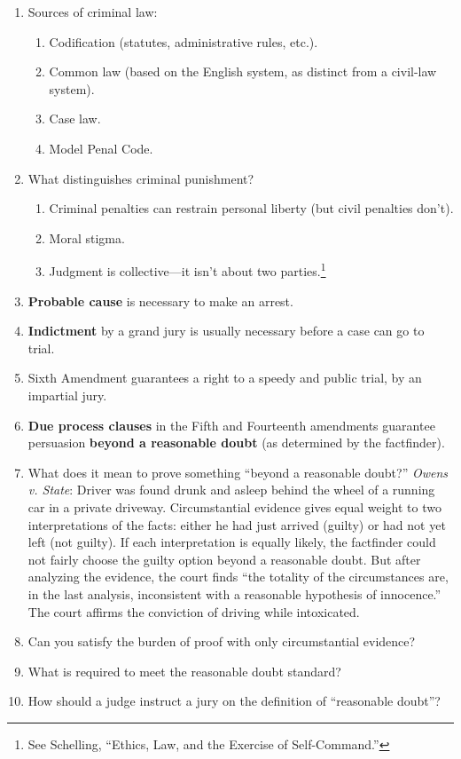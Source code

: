 \begin{enumerate}
    \item Sources of criminal law:
    \begin{enumerate}
        \item Codification (statutes, administrative rules, etc.).
        \item Common law (based on the English system, as distinct from a civil-law system).
        \item Case law.
        \item Model Penal Code.
    \end{enumerate}
    \item What distinguishes criminal punishment?
    \begin{enumerate}
        \item Criminal penalties can restrain personal liberty (but civil penalties don't).
        \item Moral stigma.
        \item Judgment is collective---it isn't about two parties.\footnote{See Schelling, ``Ethics, Law, and the Exercise of Self-Command.''}
    \end{enumerate}
    \item \textbf{Probable cause} is necessary to make an arrest.
    \item \textbf{Indictment} by a grand jury is usually necessary before a case can go to trial.
    \item Sixth Amendment guarantees a right to a speedy and public trial, by an impartial jury.
    \item \textbf{Due process clauses} in the Fifth and Fourteenth amendments guarantee persuasion \textbf{beyond a reasonable doubt} (as determined by the factfinder).
    \item What does it mean to prove something ``beyond a reasonable doubt?'' \emph{Owens v. State}: Driver was found drunk and asleep behind the wheel of a running car in a private driveway. Circumstantial evidence gives equal weight to two interpretations of the facts: either he had just arrived (guilty) or had not yet left (not guilty). If each interpretation is equally likely, the factfinder could not fairly choose the guilty option beyond a reasonable doubt. But after analyzing the evidence, the court finds ``the totality of the circumstances are, in the last analysis, inconsistent with a reasonable hypothesis of innocence.'' The court affirms the conviction of driving while intoxicated.
    \item Can you satisfy the burden of proof with only circumstantial evidence?
    \item What is required to meet the reasonable doubt standard?
    \item How should a judge instruct a jury on the definition of ``reasonable doubt''?
\end{enumerate}

